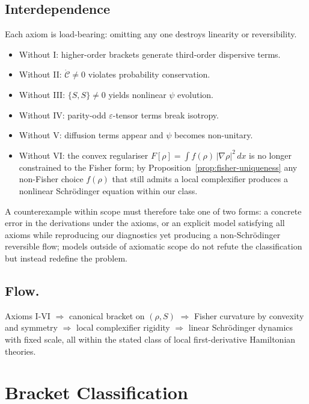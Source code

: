\documentclass[11pt,a4paper]{article}
\numberwithin{equation}{section}
\theoremstyle{thmcompact}
\theoremstyle{remark}
\begin{document}
	\subsection{Interdependence}
	Each axiom is load-bearing: omitting any one destroys linearity or reversibility.
	\begin{itemize}[leftmargin=1.5em]
		\item Without I: higher-order brackets generate third-order dispersive terms.
		\item Without II: $\dot{\mathcal C}\!\ne0$ violates probability conservation.
		\item Without III: $\{S,S\}\!\ne0$ yields nonlinear $\psi$ evolution.
		\item Without IV: parity-odd $\varepsilon$-tensor terms break isotropy.
		\item Without V: diffusion terms appear and $\psi$ becomes non-unitary.
		\item Without VI: the convex regulariser $F[\rho]=\int f(\rho)\,|\nabla\rho|^{2}\,dx$ is no longer constrained to the Fisher form; by Proposition~\ref{prop:fisher-uniqueness} any non-Fisher choice $f(\rho)$ that still admits a local complexifier produces a nonlinear Schrödinger equation within our class.

	\end{itemize}
	
A counterexample within scope must therefore take one of two forms: a concrete error in the derivations under the axioms, or an explicit model satisfying all axioms while reproducing our diagnostics yet producing a non-Schrödinger reversible flow; models outside of axiomatic scope do not refute the classification but instead redefine the problem.
	
\subsection{Flow.}
Axioms I-VI
$\Rightarrow$ canonical bracket on $(\rho,S)$
$\Rightarrow$ Fisher curvature by convexity and symmetry
$\Rightarrow$ local complexifier rigidity
$\Rightarrow$ linear Schrödinger dynamics with fixed scale,
all within the stated class of local first-derivative Hamiltonian theories.

	\section{Bracket Classification}\label{sec:bracket}
	
\end{document}
